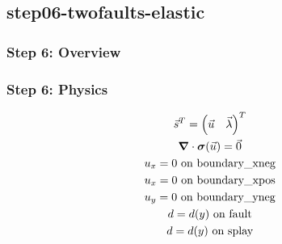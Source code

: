 \documentclass[aspectratio=169]{beamer}
\begin{document}
\subsection{step06-twofaults-elastic}

\begin{frame}
  \frametitle{Step 6: Overview}

      
\end{frame}


\begin{frame}
  \frametitle{Step 6: Physics}
  \summary{}

  \begin{minipage}{0.3\textwidth}
    {\scriptsize
    \begin{gather*}
    \vec{s}^T = \left( \vec{u} \quad \vec{\lambda} \right)^T \\
    \bm{\nabla} \cdot \bm{\sigma}(\vec{u}) = \vec{0} \\
    u_x = 0 \text{ on boundary\_xneg} \\
    u_x = 0 \text{ on boundary\_xpos} \\
    u_y = 0 \text{ on boundary\_yneg} \\
    d = d(y) \text{ on fault} \\
    d = d(y) \text{ on splay}
    \end{gather*}}
  \end{minipage}
  \hfill
  \begin{minipage}{0.67\textwidth}
  \end{minipage}
      
\end{frame}
\end{document}
